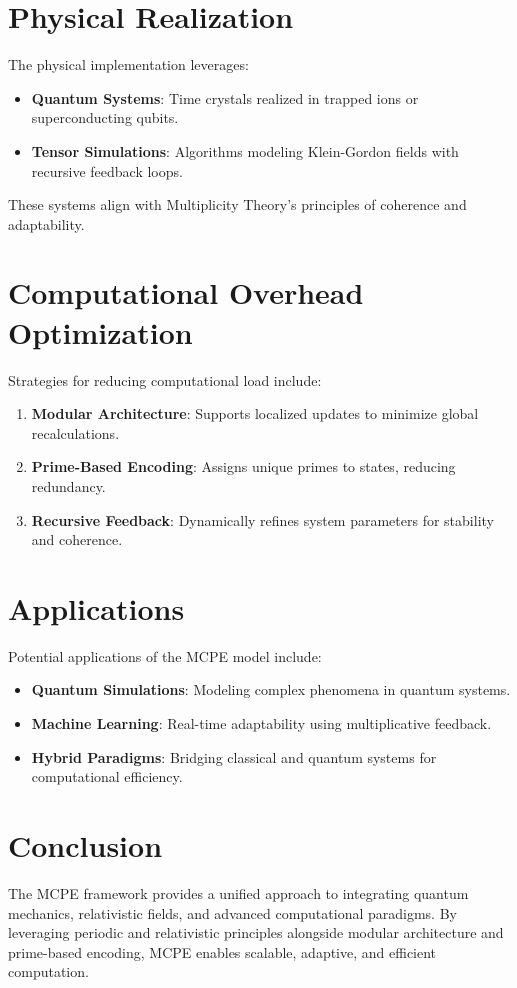 \documentclass{article}
\theoremstyle{plain}
\begin{document}
\section{Physical Realization}
The physical implementation leverages:
\begin{itemize}
    \item \textbf{Quantum Systems}: Time crystals realized in trapped ions or superconducting qubits.
    \item \textbf{Tensor Simulations}: Algorithms modeling Klein-Gordon fields with recursive feedback loops.
\end{itemize}
These systems align with Multiplicity Theory’s principles of coherence and adaptability.

\section{Computational Overhead Optimization}
Strategies for reducing computational load include:
\begin{enumerate}
    \item \textbf{Modular Architecture}: Supports localized updates to minimize global recalculations.
    \item \textbf{Prime-Based Encoding}: Assigns unique primes to states, reducing redundancy.
    \item \textbf{Recursive Feedback}: Dynamically refines system parameters for stability and coherence.
\end{enumerate}

\section{Applications}
Potential applications of the MCPE model include:
\begin{itemize}
    \item \textbf{Quantum Simulations}: Modeling complex phenomena in quantum systems.
    \item \textbf{Machine Learning}: Real-time adaptability using multiplicative feedback.
    \item \textbf{Hybrid Paradigms}: Bridging classical and quantum systems for computational efficiency.
\end{itemize}

\section{Conclusion}
The MCPE framework provides a unified approach to integrating quantum mechanics, relativistic fields, and advanced computational paradigms. By leveraging periodic and relativistic principles alongside modular architecture and prime-based encoding, MCPE enables scalable, adaptive, and efficient computation.
\end{document}

